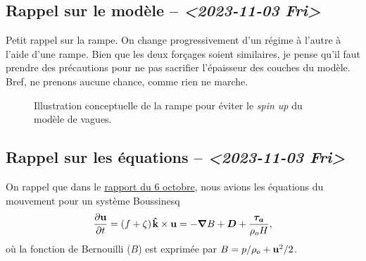 \documentclass[10pt]{report}
\numberwithin{equation}{section}
\newcommand{\kvf}{\vb{\hat{k}}}
\newcommand{\uu}{\vb{u}}
\newcommand{\pt}{\hspace{1pt}} %
\begin{document}
\subsection{Rappel sur le modèle -- \textit{<2023-11-03 Fri>}}
\label{sec:orgc1d7b0c}

Petit rappel sur la rampe.
On change progressivement d'un régime à l'autre à l'aide d'une rampe.
Bien que les deux forçages soient similaires, je pense qu'il faut prendre des précautions pour ne pas sacrifier l'épaisseur des couches du modèle.
Bref, ne prenons aucune chance, comme rien ne marche.

\begin{figure}
\begin{center}
\end{center}
\caption{\label{orgc8c7cb0}Illustration conceptuelle de la rampe pour éviter le \emph{spin up} du modèle de vagues.}
\end{figure}

\subsection{Rappel sur les équations -- \textit{<2023-11-03 Fri>}}
\label{sec:org3284552}

On rappel que dans le \href{rapport-2023-10-06.org}{rapport du 6 octobre}, nous avions les équations du mouvement pour un système Boussinesq
\begin{equation}
\label{eq:orgd53c7d1}
   \pdv{\uu}{t} = \qty(f+\zeta)\pt \kvf\times\uu = -\gradient{B} + \boldsymbol{D} + \frac{\boldsymbol{\tau_a}}{\rho_o H},
\end{equation}
où la fonction de Bernouilli (\(B\)) est exprimée par \(B = p/\rho_o + \uu^2/2\).\bigskip
\end{document}
